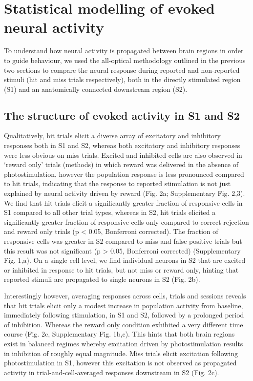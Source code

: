 \chapter{\label{res3}Statistical modelling of evoked neural activity
}

\minitoc

To understand how neural activity is propagated between brain regions in order to guide behaviour, we used the all-optical methodology outlined in the previous two sections to compare the neural response during reported and non-reported stimuli (hit and miss trials respectively), both in the directly stimulated region (S1) and an anatomically connected downstream region (S2). 

\section{The structure of evoked activity in S1 and S2}

Qualitatively, hit trials elicit a diverse array of excitatory and inhibitory responses both in S1 and S2, whereas both excitatory and inhibitory responses were less obvious on miss trials. Excited and inhibited cells are also observed in ‘reward only’ trials (methods) in which reward was delivered in the absence of photostimulation, however the population response is less pronounced compared to hit trials, indicating that the response to reported stimulation is not just explained by neural activity driven by reward (Fig. 2a; Supplementary Fig. 2,3). We find that hit trials elicit a significantly greater fraction of responsive cells in S1 compared to all other trial types, whereas in S2, hit trials elicited a significantly greater fraction of responsive cells only compared to correct rejection and reward only trials (p < 0.05, Bonferroni corrected). The fraction of responsive cells was greater in S2 compared to miss and false positive trials but this result was not significant (p > 0.05, Bonferroni corrected) (Supplementary Fig. 1,a). On a single cell level, we find individual neurons in S2 that are excited or inhibited in response to hit trials, but not miss or reward only, hinting that reported stimuli are propagated to single neurons in S2 (Fig. 2b).

Interestingly however, averaging responses across cells, trials and sessions reveals that hit trials elicit only a modest increase in population activity from baseline, immediately following stimulation, in S1 and S2, followed by a prolonged period of inhibition. Whereas the reward only condition exhibited a very different time course (Fig. 2c,  Supplementary Fig. 1b,c). This hints that both brain regions exist in balanced regimes whereby excitation driven by photostimulation results in inhibition of roughly equal magnitude. Miss trials elicit excitation following photostimulation in S1, however this excitation is not observed as propagated activity in trial-and-cell-averaged responses downstream in S2 (Fig. 2c). 

